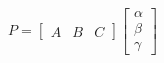 \documentclass{article}
\begin{document}
\thispagestyle{empty}

$$
P = \begin{bmatrix}A & B & C\end{bmatrix} \begin{bmatrix}\alpha\\ \beta\\ \gamma\end{bmatrix}
$$
\end{document}
